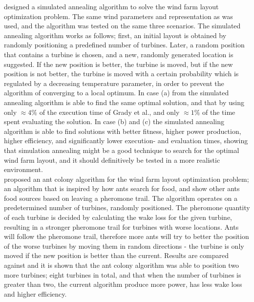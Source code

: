 \noindent \cite{Bilbao} designed a simulated annealing algorithm to solve the wind farm layout optimization problem. The same wind parameters and representation as \cite{Grady} was used, and the algorithm was tested on the same three scenarios. The simulated annealing algorithm works as follows; first, an initial layout is obtained by randomly positioning a predefined number of turbines. Later, a random position that contains a turbine is chosen, and a new, randomly generated location is suggested. If the new position is better, the turbine is moved, but if the new position is not better, the turbine is moved with a certain probability which is regulated by a decreasing temperature parameter, in order to prevent the algorithm of converging to a local optimum. In case (a) from \citep{Grady} the simulated annealing algorithm is able to find the same optimal solution, and that by using only $\approx 4\%$ of the execution time of Grady et al., and only $\approx 1\%$ of the time spent evaluating the solution. In case (b) and (c) the simulated annealing algorithm is able to find solutions with better fitness, higher power production, higher efficiency, and significantly lower execution- and evaluation times, showing that simulation annealing might be a good technique to search for the optimal wind farm layout, and it should definitively be tested in a more realistic environment. \\ 


\noindent \cite{Eroglu} proposed an ant colony algorithm for the wind farm layout optimization problem; an algorithm that is inspired by how ants search for food, and show other ants food sources based on leaving a pheromone trail. The algorithm operates on a predetermined number of turbines, randomly positioned. The pheromone quantity of each turbine is decided by calculating the wake loss for the given turbine, resulting in a stronger pheromone trail for turbines with worse locations. Ants will follow the pheromone trail, therefore more ants will try to better the position of the worse turbines by moving them in random directions - the turbine is only moved if the new position is better than the current. Results are compared against \citep{Kusiak} and it is shown that the ant colony algorithm was able to position two more turbines; eight turbines in total, and that when the number of turbines is greater than two, the current algorithm produce more power, has less wake loss and higher efficiency.\\


